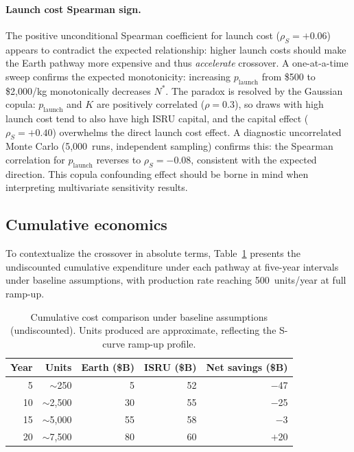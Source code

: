 \documentclass[preprint,12pt]{elsarticle}
\begin{document}
\paragraph{Launch cost Spearman sign.} The positive unconditional Spearman coefficient for launch cost ($\rho_S = +0.06$) appears to contradict the expected relationship: higher launch costs should make the Earth pathway more expensive and thus \emph{accelerate} crossover. A one-at-a-time sweep confirms the expected monotonicity: increasing $p_{\mathrm{launch}}$ from \$500 to \$2{,}000/kg monotonically decreases $N^*$. The paradox is resolved by the Gaussian copula: $p_{\mathrm{launch}}$ and $K$ are positively correlated ($\rho = 0.3$), so draws with high launch cost tend to also have high ISRU capital, and the capital effect ($\rho_S = +0.40$) overwhelms the direct launch cost effect. A diagnostic uncorrelated Monte Carlo (5{,}000~runs, independent sampling) confirms this: the Spearman correlation for $p_{\mathrm{launch}}$ reverses to $\rho_S = -0.08$, consistent with the expected direction. This copula confounding effect should be borne in mind when interpreting multivariate sensitivity results.

\subsection{Cumulative economics}

To contextualize the crossover in absolute terms, Table~\ref{tab:cumulative} presents the undiscounted cumulative expenditure under each pathway at five-year intervals under baseline assumptions, with production rate reaching 500~units/year at full ramp-up.

\begin{table}[htbp]
\centering
\caption{Cumulative cost comparison under baseline assumptions (undiscounted). Units produced are approximate, reflecting the S-curve ramp-up profile.}
\label{tab:cumulative}
\begin{tabular}{@{}rrrrr@{}}
\toprule
Year & Units & Earth (\$B) & ISRU (\$B) & Net savings (\$B) \\
\midrule
5  & $\sim$250   & 5   & 52  & $-$47  \\
10 & $\sim$2{,}500 & 30  & 55  & $-$25  \\
15 & $\sim$5{,}000 & 55  & 58  & $-$3   \\
20 & $\sim$7{,}500 & 80  & 60  & $+$20  \\
\bottomrule
\end{tabular}
\end{table}
\end{document}
